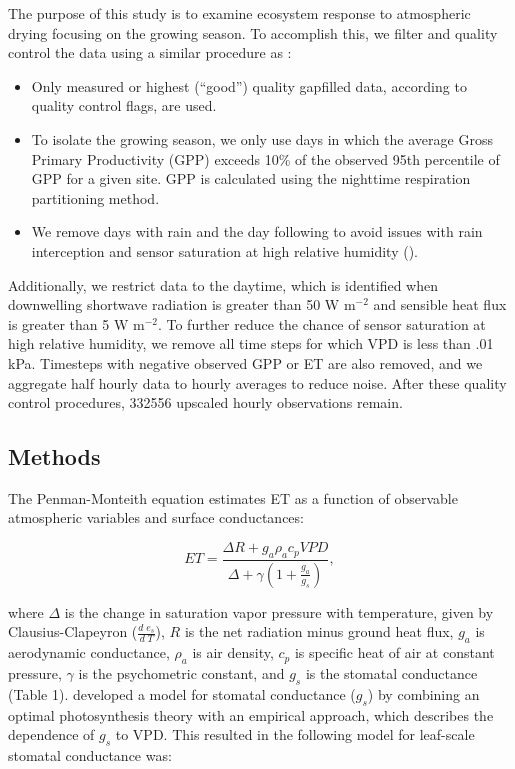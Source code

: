 \documentclass[draft,linenumbers]{gcbjournal}
\begin{document}
The purpose of this study is to examine ecosystem response to atmospheric drying focusing on the growing season. To accomplish this, we filter and quality control the data using a similar procedure as \cite{Zhou_2015}:
\begin{itemize}
\item Only measured or highest (``good'') quality gapfilled data, according to quality control flags, are used.
\item To isolate the growing season, we only use days in which the average Gross Primary Productivity (GPP) exceeds 10\% of the observed 95th percentile of GPP for a given site. GPP is calculated using the nighttime respiration partitioning method.
\item We remove days with rain and the day following to avoid issues with rain interception and sensor saturation at high relative humidity (\cite{MEDLYN_2011}).
\end{itemize}
Additionally, we restrict data to the daytime, which is identified when downwelling shortwave radiation is greater than 50 W m$^{-2}$ and sensible heat flux is greater than 5 W m$^{-2}$. To further reduce the chance of sensor saturation at high relative humidity, we remove all time steps for which VPD is less than .01 kPa. Timesteps with negative observed GPP or ET are also removed, and we aggregate half hourly data to hourly averages to reduce noise. After these quality control procedures, 332556 upscaled hourly observations remain. 

\subsection{Methods}
\label{methods}
The Penman-Monteith equation \citep [hereafter PM,][]{Monteith_1965} estimates ET as a function of observable atmospheric variables and surface conductances:
\begin{linenomath*}
  \begin{equation}
    \label{orig_pen}
    ET = \frac{\Delta R + g_a \rho_a c_p VPD}{\Delta + \gamma(1 + \frac{g_a}{g_s})},
  \end{equation}
\end{linenomath*}
where $\Delta$ is the change in saturation vapor pressure with temperature, given by Clausius-Clapeyron ($\frac{d \; e_s}{d \; T}$), $R$ is the net radiation minus ground heat flux, $g_a$ is aerodynamic conductance, $\rho_a$ is air density, $c_p$ is specific heat of air at constant pressure, $\gamma$ is the psychometric constant, and $g_s$ is the stomatal conductance (Table 1). \citet{MEDLYN_2011} developed a model for stomatal conductance ($g_s$) by combining an optimal photosynthesis theory \citep{Farquhar_1980, Katul_2010} with an empirical approach, which describes the dependence of $g_s$ to VPD. This resulted in the following model for leaf-scale stomatal conductance was:
\end{document}
